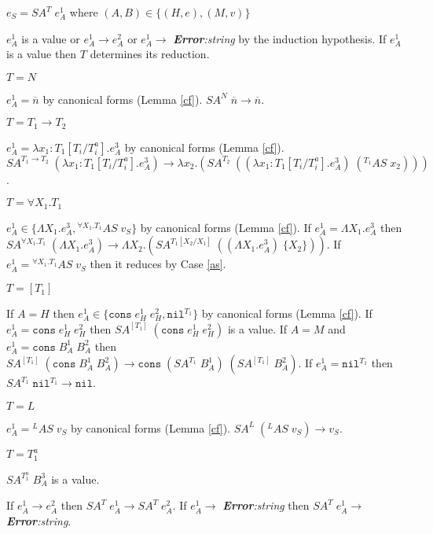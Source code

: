 \begin{case}
$e_{S}=SA^{T}\;e_{A}^{1}$ where $(A,B)\in\lbrace(H,e),(M,v)\rbrace$

$e_{A}^{1}$ is a value or $e_{A}^{1}\rightarrow e_{A}^{2}$ or $e_{A}^{1}\rightarrow$ \emph{\textbf{Error}:\;string} by the induction hypothesis.  If $e_{A}^{1}$ is a value then $T$ determines its reduction.
\begin{subcase}
$T=N$

$e_{A}^{1}=\overline{n}$ by canonical forms (Lemma \ref{cf}).  $SA^{N}\;\overline{n}\rightarrow\overline{n}$.
\end{subcase}
\begin{subcase}
$T=T_{1}\rightarrow T_{2}$

$e_{A}^{1}=\lambda x_{1}:T_{1}[T_{i}/T_{i}^{a}].e_{A}^{3}$ by canonical forms (Lemma \ref{cf}).  $SA^{T_{1}\rightarrow T_{2}}\;(\lambda x_{1}:T_{1}[T_{i}/T_{i}^{a}].e_{A}^{3})\rightarrow\lambda x_{2}.(SA^{T_{2}}\;((\lambda x_{1}:T_{1}[T_{i}/T_{i}^{a}].e_{A}^{3})\;(^{T_{1}}AS\;x_{2})))$.
\end{subcase}
\begin{subcase}
$T=\forall X_{1}.T_{1}$

$e_{A}^{1}\in\lbrace\Lambda X_{1}.e_{A}^{3},{^{\forall X_{1}.T_{1}}A}S\;v_{S}\rbrace$ by canonical forms (Lemma \ref{cf}).  If $e_{A}^{1}=\Lambda X_{1}.e_{A}^{3}$ then $SA^{\forall X_{1}.T_{1}}\;(\Lambda X_{1}.e_{A}^{3})\rightarrow\Lambda X_{2}.(SA^{T_{1}[X_{2}/X_{1}]}\;((\Lambda X_{1}.e_{A}^{3})\;\lbrace X_{2}\rbrace))$.  If $e_{A}^{1}={^{\forall X_{1}.T_{1}}A}S\;v_{S}$ then it reduces by Case \ref{as}.
\end{subcase}
\begin{subcase}
$T=[T_{1}]$

If $A=H$ then $e_{A}^{1}\in\lbrace\mathtt{cons}\;e_{H}^{1}\;e_{H}^{2},\mathtt{nil}^{T_{1}}\rbrace$ by canonical forms (Lemma \ref{cf}).  If $e_{A}^{1}=\mathtt{cons}\;e_{H}^{1}\;e_{H}^{2}$ then $SA^{[T_{1}]}\;(\mathtt{cons}\;e_{H}^{1}\;e_{H}^{2})$ is a value.  If $A=M$ and $e_{A}^{1}=\mathtt{cons}\;B_{A}^{1}\;B_{A}^{2}$ then $SA^{[T_{1}]}\;(\mathtt{cons}\;B_{A}^{1}\;B_{A}^{2})\rightarrow\mathtt{cons}\;(SA^{T_{1}}\;B_{A}^{1})\;(SA^{[T_{1}]}\;B_{A}^{2})$.  If $e_{A}^{1}=\mathtt{nil}^{T_{1}}$ then $SA^{T_{1}}\;\mathtt{nil}^{T_{1}}\rightarrow\mathtt{nil}$.
\end{subcase}
\begin{subcase}
$T=L$

$e_{A}^{1}={^{L}A}S\;v_{S}$ by canonical forms (Lemma \ref{cf}).  $SA^{L}\;(^{L}AS\;v_{S})\rightarrow v_{S}$.
\end{subcase}
\begin{subcase}
$T=T_{1}^{a}$

$SA^{T_{1}^{a}}\;B_{A}^{3}$ is a value.
\end{subcase}
If $e_{A}^{1}\rightarrow e_{A}^{2}$ then $SA^{T}\;e_{A}^{1}\rightarrow SA^{T}\;e_{A}^{2}$.  If $e_{A}^{1}\rightarrow$ \emph{\textbf{Error}:\;string} then $SA^{T}\;e_{A}^{1}\rightarrow$ \emph{\textbf{Error}:\;string}.
\end{case}